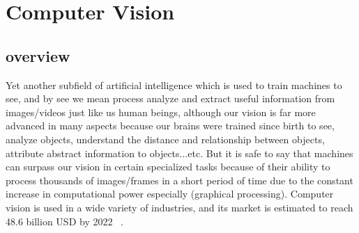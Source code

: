     



    \section{Computer Vision}
    \subsection{overview}
        Yet another subfield of artificial intelligence which is used to train machines to see, and by see we mean process analyze and extract useful information from images/videos just like us human beings, although our vision is far more advanced in many aspects because our brains were trained since birth to see, analyze objects, understand the distance and relationship between objects, attribute abstract information to objects...etc. But it is safe to say that machines can surpass our vision in certain specialized tasks because of their ability to process thousands of images/frames in a short period of time due to the constant increase in computational power especially (graphical processing). Computer vision is used in a wide variety of industries, and its market is estimated to reach 48.6 billion USD by 2022 ~\cite{machine-learning-ibm}.


